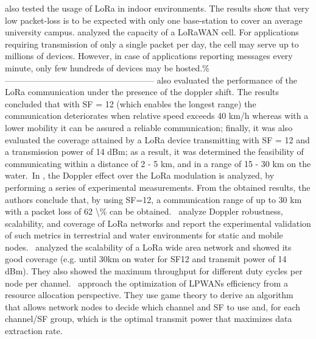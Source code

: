  \cite{petajajarvi_evaluation_2017}   \citet{petajajarvi_evaluation_2017} also tested the usage of LoRa in indoor environments. The results show that very low packet-loss is to be expected with only one base-station to cover an average university campus.   \newline 
 \cite{petajajarvi_performance_2017}   \citet{petajajarvi_performance_2017} analyzed the capacity of a LoRaWAN cell. For applications requiring transmission of only a single packet per day, the cell may serve up to millions of devices. However, in case of applications reporting messages every minute, only few hundreds of devices may be hosted.\% ----------------------------------------------------- \citet{petajajarvi_performance_2017} also evaluated the performance of the LoRa communication under the presence of the doppler shift. The results concluded that with SF = 12 (which enables the longest range) the communication deteriorates when relative speed exceeds 40 km/h whereas with a lower mobility it can be assured a reliable communication; finally, it was also evaluated the coverage attained by a LoRa device transmitting with SF = 12 and a transmission power of 14 dBm; as a result, it was determined the feasibility of communicating within a distance of 2 - 5 km, and in a range of 15 - 30 km on the water.~In \cite{petajajarvi_performance_2017}, the Doppler effect over the LoRa modulation is analyzed, by performing a series of experimental measurements. From the obtained results, the authors conclude that, by using SF=12, a communication range of up to 30 km with a packet loss of 62 \textbackslash\% can be obtained.~\citet{petajajarvi_performance_2017} analyze Doppler robustness, scalability, and coverage of LoRa networks and report the experimental validation of such metrics in terrestrial and water environments for static and mobile nodes.~\citet{petajajarvi_performance_2017} analyzed the scalability of a LoRa wide area network and showed its good coverage (e.g. until 30km on water for SF12 and transmit power of 14 dBm). They also showed the maximum throughput for different duty cycles per node per channel.~   \newline 
 \cite{qin_resource_2017}   \citet{qin_resource_2017} approach the optimization of LPWANs efficiency from a resource allocation perspective. They use game theory to derive an algorithm that allows network nodes to decide which channel and SF to use and, for each channel/SF group, which is the optimal transmit power that maximizes data extraction rate.~   \newline 
